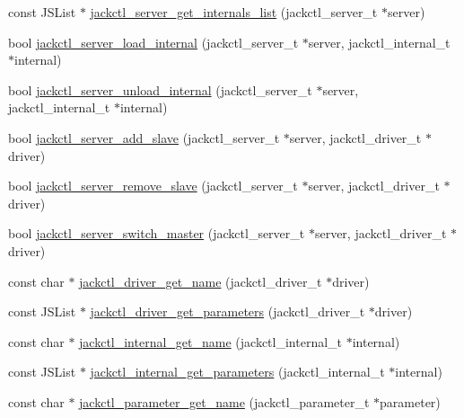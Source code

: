 \begin{DoxyCompactItemize}
\item 
const \-J\-S\-List $\ast$ \hyperlink{group__ServerControl_gacf1e2a650fec3f019bb36e49ffacde4f}{jackctl\-\_\-server\-\_\-get\-\_\-internals\-\_\-list} (jackctl\-\_\-server\-\_\-t $\ast$server)
\item 
bool \hyperlink{group__ServerControl_ga338effc099ff0cf03648971df51f9086}{jackctl\-\_\-server\-\_\-load\-\_\-internal} (jackctl\-\_\-server\-\_\-t $\ast$server, jackctl\-\_\-internal\-\_\-t $\ast$internal)
\item 
bool \hyperlink{group__ServerControl_gac0d0b9b2c5323da9193db9a0aa84bdf9}{jackctl\-\_\-server\-\_\-unload\-\_\-internal} (jackctl\-\_\-server\-\_\-t $\ast$server, jackctl\-\_\-internal\-\_\-t $\ast$internal)
\item 
bool \hyperlink{group__ServerControl_gadacbb19d2f9e614ce33c8aedaa04fda1}{jackctl\-\_\-server\-\_\-add\-\_\-slave} (jackctl\-\_\-server\-\_\-t $\ast$server, jackctl\-\_\-driver\-\_\-t $\ast$driver)
\item 
bool \hyperlink{group__ServerControl_gac71a7c5d85e891a51a57f2575aea627c}{jackctl\-\_\-server\-\_\-remove\-\_\-slave} (jackctl\-\_\-server\-\_\-t $\ast$server, jackctl\-\_\-driver\-\_\-t $\ast$driver)
\item 
bool \hyperlink{group__ServerControl_ga3bfe5d4befb9d9bab8f05e13d37ca7b3}{jackctl\-\_\-server\-\_\-switch\-\_\-master} (jackctl\-\_\-server\-\_\-t $\ast$server, jackctl\-\_\-driver\-\_\-t $\ast$driver)
\item 
const char $\ast$ \hyperlink{group__ServerControl_ga9e28945c015f343e7a82c4e76e9cb1b4}{jackctl\-\_\-driver\-\_\-get\-\_\-name} (jackctl\-\_\-driver\-\_\-t $\ast$driver)
\item 
const \-J\-S\-List $\ast$ \hyperlink{group__ServerControl_ga0f73cfb0c40a401ca6aa617073303e72}{jackctl\-\_\-driver\-\_\-get\-\_\-parameters} (jackctl\-\_\-driver\-\_\-t $\ast$driver)
\item 
const char $\ast$ \hyperlink{group__ServerControl_ga4d14a6526174de9d085b203a7b7d632a}{jackctl\-\_\-internal\-\_\-get\-\_\-name} (jackctl\-\_\-internal\-\_\-t $\ast$internal)
\item 
const \-J\-S\-List $\ast$ \hyperlink{group__ServerControl_gade591618ee972b92724be7ee87a3943a}{jackctl\-\_\-internal\-\_\-get\-\_\-parameters} (jackctl\-\_\-internal\-\_\-t $\ast$internal)
\item 
const char $\ast$ \hyperlink{group__ServerControl_ga3a123ee66e7605b1f17db88d4f5b8ac8}{jackctl\-\_\-parameter\-\_\-get\-\_\-name} (jackctl\-\_\-parameter\-\_\-t $\ast$parameter)

\end{DoxyCompactItemize}
